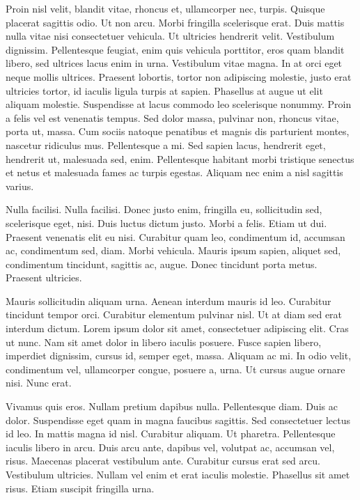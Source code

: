 \documentclass[eng,printmode]{mgr}
\begin{document}
Proin nisl velit, blandit vitae, rhoncus et, ullamcorper nec, turpis. Quisque placerat sagittis odio. Ut non arcu. Morbi fringilla scelerisque erat. Duis mattis nulla vitae nisi consectetuer vehicula. Ut ultricies hendrerit velit. Vestibulum dignissim. Pellentesque feugiat, enim quis vehicula porttitor, eros quam blandit libero, sed ultrices lacus enim in urna. Vestibulum vitae magna. In at orci eget neque mollis ultrices. Praesent lobortis, tortor non adipiscing molestie, justo erat ultricies tortor, id iaculis ligula turpis at sapien. Phasellus at augue ut elit aliquam molestie. Suspendisse at lacus commodo leo scelerisque nonummy. Proin a felis vel est venenatis tempus. Sed dolor massa, pulvinar non, rhoncus vitae, porta ut, massa. Cum sociis natoque penatibus et magnis dis parturient montes, nascetur ridiculus mus. Pellentesque a mi. Sed sapien lacus, hendrerit eget, hendrerit ut, malesuada sed, enim. Pellentesque habitant morbi tristique senectus et netus et malesuada fames ac turpis egestas. Aliquam nec enim a nisl sagittis varius. 

Nulla facilisi. Nulla facilisi. Donec justo enim, fringilla eu, sollicitudin sed, scelerisque eget, nisi. Duis luctus dictum justo. Morbi a felis. Etiam ut dui. Praesent venenatis elit eu nisi. Curabitur quam leo, condimentum id, accumsan ac, condimentum sed, diam. Morbi vehicula. Mauris ipsum sapien, aliquet sed, condimentum tincidunt, sagittis ac, augue. Donec tincidunt porta metus. Praesent ultricies. 

Mauris sollicitudin aliquam urna. Aenean interdum mauris id leo. Curabitur tincidunt tempor orci. Curabitur elementum pulvinar nisl. Ut at diam sed erat interdum dictum. Lorem ipsum dolor sit amet, consectetuer adipiscing elit. Cras ut nunc. Nam sit amet dolor in libero iaculis posuere. Fusce sapien libero, imperdiet dignissim, cursus id, semper eget, massa. Aliquam ac mi. In odio velit, condimentum vel, ullamcorper congue, posuere a, urna. Ut cursus augue ornare nisi. Nunc erat. 

Vivamus quis eros. Nullam pretium dapibus nulla. Pellentesque diam. Duis ac dolor. Suspendisse eget quam in magna faucibus sagittis. Sed consectetuer lectus id leo. In mattis magna id nisl. Curabitur aliquam. Ut pharetra. Pellentesque iaculis libero in arcu. Duis arcu ante, dapibus vel, volutpat ac, accumsan vel, risus. Maecenas placerat vestibulum ante. Curabitur cursus erat sed arcu. Vestibulum ultricies. Nullam vel enim et erat iaculis molestie. Phasellus sit amet risus. Etiam suscipit fringilla urna. 
\end{document}
